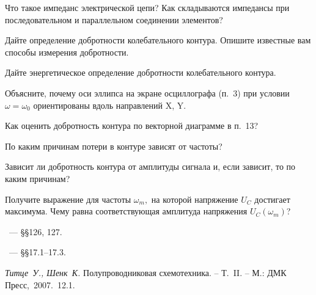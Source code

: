 \begin{lab:questions}
    \item Что такое импеданс электрической цепи?
    Как складываются импедансы при последовательном и параллельном
    соединении элементов?
    
     \item Дайте определение добротности колебательного контура.
     Опишите известные вам способы измерения добротности.
     
	\item Дайте энергетическое определение добротности колебательного контура.

	\item Объясните, почему оси эллипса на экране осциллографа (п.~3) при
условии $\omega=\omega_0$ ориентированы вдоль направлений X, Y.

	\item Как оценить добротность контура по векторной диаграмме в п.~13?

	\item По каким причинам потери в контуре зависят от частоты?

	\item Зависит ли добротность контура от амплитуды сигнала и, если зависит,
то по каким причинам?

	\item Получите выражение для частоты $\omega_m,$ на которой напряжение $U_C$
достигает максимума. Чему равна соответствующая амплитуда напряжения $U_C(\omega_m)$?
\end{lab:questions}


\begin{lab:literature}
    \item \SivuhinIII~--- \S\S126, 127.
    \item \Kirichenko~--- \S\S17.1--17.3.
	\item \textit{Титце~У., Шенк~К.} Полупроводниковая схемотехника.  – Т.~II. –
М.: ДМК Пресс,~2007.~12.1.
\end{lab:literature}
